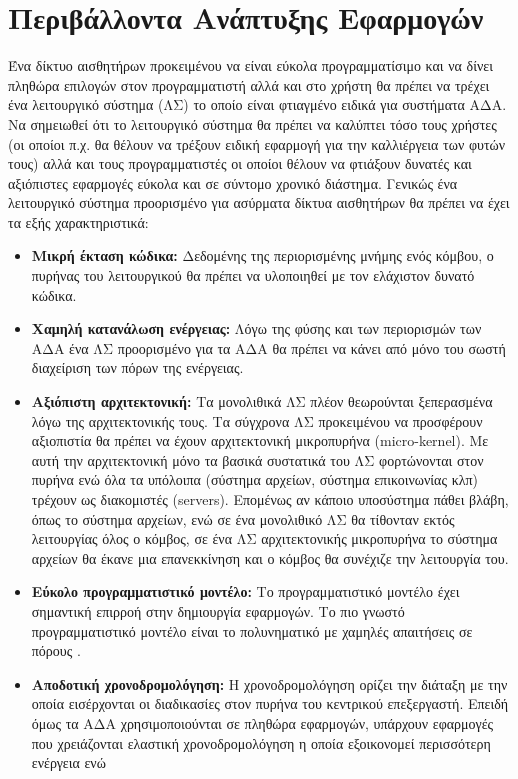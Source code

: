 \section{Περιβάλλοντα Ανάπτυξης Εφαρμογών}
Ένα δίκτυο αισθητήρων προκειμένου να είναι εύκολα προγραμματίσιμο και να δίνει πληθώρα επιλογών στον προγραμματιστή αλλά και στο χρήστη θα πρέπει να τρέχει ένα
λειτουργικό σύστημα (ΛΣ) το οποίο είναι φτιαγμένο ειδικά για συστήματα ΑΔΑ.
Να σημειωθεί ότι το λειτουργικό σύστημα θα πρέπει να καλύπτει τόσο τους χρήστες (οι οποίοι π.χ. θα θέλουν να τρέξουν ειδική εφαρμογή για την καλλιέργεια των φυτών
τους) αλλά και τους προγραμματιστές οι οποίοι θέλουν να φτιάξουν δυνατές και αξιόπιστες εφαρμογές εύκολα και σε σύντομο χρονικό διάστημα.
Γενικώς ένα λειτουργικό σύστημα προορισμένο για ασύρματα δίκτυα αισθητήρων θα πρέπει να έχει τα εξής χαρακτηριστικά:
\begin{itemize}
\item \textbf{Μικρή έκταση κώδικα:} Δεδομένης της περιορισμένης μνήμης ενός κόμβου, ο πυρήνας του λειτουργικού θα πρέπει να υλοποιηθεί με τον ελάχιστον δυνατό
κώδικα.
\item \textbf{Χαμηλή κατανάλωση ενέργειας:} Λόγω της φύσης και των περιορισμών των ΑΔΑ ένα ΛΣ προορισμένο για τα ΑΔΑ θα πρέπει να κάνει από μόνο του σωστή
διαχείριση των πόρων της ενέργειας.
\item \textbf{Αξιόπιστη αρχιτεκτονική:} Τα μονολιθικά ΛΣ πλέον θεωρούνται ξεπερασμένα λόγω της αρχιτεκτονικής τους. Τα σύγχρονα ΛΣ προκειμένου να προσφέρουν
αξιοπιστία θα πρέπει να έχουν αρχιτεκτονική μικροπυρήνα (micro-kernel).
Με αυτή την αρχιτεκτονική μόνο τα βασικά συστατικά του ΛΣ φορτώνονται στον πυρήνα ενώ όλα τα υπόλοιπα (σύστημα αρχείων, σύστημα επικοινωνίας κλπ) τρέχουν ως
διακομιστές (servers).
Επομένως αν κάποιο υποσύστημα πάθει βλάβη, όπως το σύστημα αρχείων, ενώ σε ένα μονολιθικό ΛΣ θα τίθονταν εκτός λειτουργίας όλος ο κόμβος, σε ένα ΛΣ αρχιτεκτονικής
μικροπυρήνα το σύστημα αρχείων θα έκανε μια επανεκκίνηση και ο κόμβος θα συνέχιζε την λειτουργία του.
\item \textbf{Εύκολο προγραμματιστικό μοντέλο:} Το προγραμματιστικό μοντέλο έχει σημαντική επιρροή στην δημιουργία εφαρμογών.
Tο πιο γνωστό προγραμματιστικό μοντέλο είναι το πολυνηματικό με χαμηλές απαιτήσεις σε πόρους \cite{os_sensors}.
\item \textbf{Αποδοτική χρονοδρομολόγηση:} Η χρονοδρομολόγηση ορίζει την διάταξη με την οποία εισέρχονται οι διαδικασίες στον πυρήνα του κεντρικού επεξεργαστή.
Επειδή όμως τα ΑΔΑ χρησιμοποιούνται σε πληθώρα εφαρμογών, υπάρχουν εφαρμογές που χρειάζονται ελαστική χρονοδρομολόγηση η οποία εξοικονομεί περισσότερη ενέργεια ενώ

\end{itemize}

